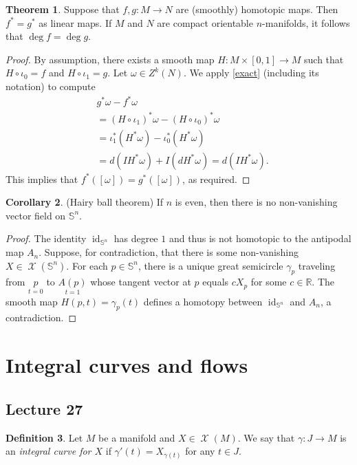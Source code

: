 \documentclass[10pt,letterpaper,cm]{nupset}
\theoremstyle{definition}
\newtheorem{definition}{Definition}[subsection]
\theoremstyle{theorem}
\newtheorem{theorem}[definition]{Theorem}
\newtheorem{corollary}[definition]{Corollary}
\theoremstyle{remark}
\newcommand{\R}{\mathbb R}
\renewcommand{\S}{\mathbb S}
\newcommand{\1}{\mathbf{1}}
\newcommand{\0}{\vec 0}
\DeclareMathOperator{\id}{id}
\DeclareMathOperator{\vf}{\mathscr{X}}
\begin{document}
\begin{theorem}
Suppose that $f,g: M \to N$ are (smoothly) homotopic maps. Then $f^{\ast} = g^{\ast}$ as linear maps. If $M$ and $N$ are compact orientable $n$-manifolds, it follows that $\deg f= \deg g$.
\end{theorem}
\begin{proof}
By assumption, there exists a smooth map $H: M \times [0,1] \to M$ such that $H \circ \iota_0 =f$ and $H \circ \iota_1 = g$. Let $\omega \in Z^k(N)$. We apply \cref{exact} (including its notation) to compute
\begin{align*}
& g^{\ast} \omega - f^{\ast} \omega 
\\ & = (H \circ \iota_1)^{\ast} \omega - (H \circ \iota_0)^{\ast} \omega
\\ & = \iota_1^{\ast} (H^{\ast} \omega) -  \iota_0^{\ast} (H^{\ast} \omega)
\\ & = d(IH^{\ast}\omega)+I(dH^{\ast}\omega) = d(IH^{\ast}\omega).
\end{align*} 
This implies that $f^{\ast}([\omega]) = g^{\ast}([\omega])$, as required. 
\end{proof}

\begin{corollary}{(Hairy ball theorem)} 
If $n$ is even, then there is no non-vanishing vector field on $\S^n$.
\end{corollary}
\begin{proof}
The identity $\id_{\S^n}$ has degree $1$ and thus is not homotopic to the antipodal map $A_n$. Suppose, for contradiction, that there is some non-vanishing $X\in \vf(\S^n)$. For each $p\in \S^n$, there is a unique great semicircle $\gamma_p$ traveling from $\underset{t=0}{p}$ to $\underset{t=1}{A(p)}$ whose tangent vector at $p$ equals $c X_p$ for some $c\in \R$. The smooth map $H(p, t) =\gamma_p(t)$ defines a homotopy between $\id_{\S^n}$  and $A_n$, a contradiction. 
\end{proof}

\section{Integral curves and flows}

\subsection{Lecture 27}

\begin{definition}
Let $M$ be a manifold and $X\in \vf(M)$. We say that $\gamma : J \to M$ is an \textit{integral curve for $X$} if $\gamma'(t) = X_{\gamma(t)}$ for any $t\in J$.
\end{definition}
\end{document}
